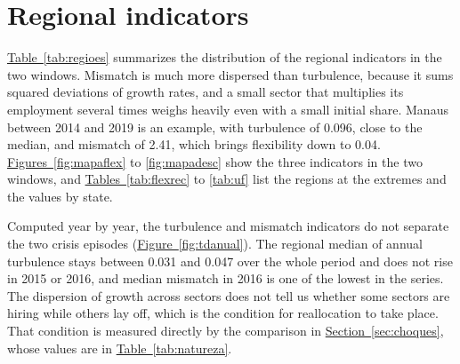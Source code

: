 \documentclass[11pt,a4paper]{article}
\let\secaoorig\section
\renewcommand{\section}{\clearpage\secaoorig}
\begin{document}
\begin{table}[!htb]
\centering
\caption{Decomposition of the change in the average portability index}
\label{tab:shiftshare}

\end{table}

\begin{table}[!htb]
\centering
\caption{Employment, portability index and groups by year}
\label{tab:indiceano}
\setlength{\tabcolsep}{4.5pt}

\end{table}

\begin{table}[!htb]
\centering
\caption{Portability index by CBO major group, 2010}
\label{tab:gg}

\end{table}

\begin{table}[!htb]
\centering
\caption{Most and least portable occupations, 2023}
\label{tab:extremos}

\end{table}

\FloatBarrier
\section{Regional indicators}
\label{ap:regioes}

\hyperref[tab:regioes]{Table~\ref*{tab:regioes}} summarizes the distribution of the regional indicators in the two windows. Mismatch is much more dispersed than turbulence, because it sums squared deviations of growth rates, and a small sector that multiplies its employment several times weighs heavily even with a small initial share. Manaus between 2014 and 2019 is an example, with turbulence of 0.096, close to the median, and mismatch of 2.41, which brings flexibility down to 0.04. \hyperref[fig:mapaflex]{Figures~\ref*{fig:mapaflex}} to \hyperref[fig:mapadesc]{\ref*{fig:mapadesc}} show the three indicators in the two windows, and \hyperref[tab:flexrec]{Tables~\ref*{tab:flexrec}} to \hyperref[tab:uf]{\ref*{tab:uf}} list the regions at the extremes and the values by state.

Computed year by year, the turbulence and mismatch indicators do not separate the two crisis episodes (\hyperref[fig:tdanual]{Figure~\ref*{fig:tdanual}}). The regional median of annual turbulence stays between 0.031 and 0.047 over the whole period and does not rise in 2015 or 2016, and median mismatch in 2016 is one of the lowest in the series. The dispersion of growth across sectors does not tell us whether some sectors are hiring while others lay off, which is the condition for reallocation to take place. That condition is measured directly by the comparison in \hyperref[sec:choques]{Section~\ref*{sec:choques}}, whose values are in \hyperref[tab:natureza]{Table~\ref*{tab:natureza}}.
\end{document}
